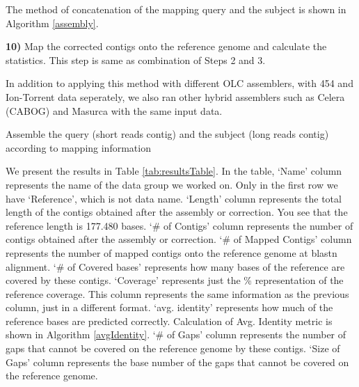 \documentclass[12pt]{article}
\begin{document}
The method of concatenation of the mapping query and the subject is shown in Algorithm \ref{assembly}. 

\textbf{10)} Map the corrected contigs onto the reference genome and calculate the statistics. This step is same as combination of Steps 2 and 3.

In addition to applying this method with different OLC assemblers, with 454 and Ion-Torrent data seperately, we also ran other hybrid assemblers such as Celera (CABOG)\cite{cabogMiller:2008} and Masurca \cite{masurcaZimin:2013} with the same input data. 

\begin{algorithm}
\caption{Assemble the query (short reads contig) and the subject (long reads contig) according to mapping information}
\label{assembly}
\begin{algorithmic} 
\ENDIF
{}
\ENDIF
{}
\ENDIF
{}
\ENDIF
\end{algorithmic}
\end{algorithm}


We present the results in Table \ref{tab:resultsTable}. In the table, `Name' column represents the name of the data group we worked on. Only in the first row we have `Reference', which is not data name. `Length' column represents the total length of the contigs obtained after the assembly or correction. You see that the reference length is 177.480 bases. `\# of Contigs' column represents the number of contigs obtained after the assembly or correction. `\# of Mapped Contigs' column represents the number of mapped contigs onto the reference genome at blastn alignment. `\# of Covered bases' represents how many bases of the reference are covered by these contigs. `Coverage' represents just the \% representation of the reference coverage. This column represents the same information as the previous column, just in a different format. `avg. identity' represents how much of the reference bases are predicted correctly. Calculation of Avg. Identity metric is shown in Algorithm  \ref{avgIdentity}. `\# of Gaps' column represents the number of gaps that cannot be covered on the reference genome by these contigs. `Size of Gaps' column represents the base number of the gaps that cannot be covered on the reference genome.
\end{document}
